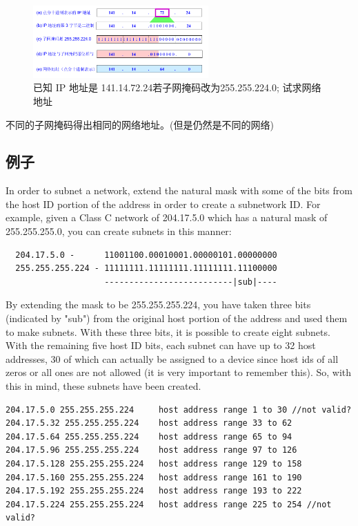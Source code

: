 \documentclass[a4paper]{report}
\begin{document}
\begin{figure}[H]
\centering
\includegraphics[width=0.6\textwidth]{ip_submask_exp_2.png}
\caption{已知 IP 地址是 141.14.72.24若子网掩码改为255.255.224.0; 试求网络地址}
\end{figure}
不同的子网掩码得出相同的网络地址。(但是仍然是不同的网络)

\subsection{例子}

In order to subnet a network, extend the natural mask with some of the bits from the host ID portion of the address in order to create a subnetwork ID. For example, given a Class C network of 204.17.5.0 which has a natural mask of 255.255.255.0, you can create subnets in this manner:
\begin{verbatim}
  204.17.5.0 -      11001100.00010001.00000101.00000000
  255.255.255.224 - 11111111.11111111.11111111.11100000
                    --------------------------|sub|----
\end{verbatim}
By extending the mask to be 255.255.255.224, you have taken three bits (indicated by "sub") from the original host portion of the address and used them to make subnets. With these three bits, it is possible to create eight subnets. With the remaining five host ID bits, each subnet can have up to 32 host addresses, 30 of which can actually be assigned to a device since host ids of all zeros or all ones are not allowed (it is very important to remember this). So, with this in mind, these subnets have been created.
\begin{verbatim}
204.17.5.0 255.255.255.224     host address range 1 to 30 //not valid? 
204.17.5.32 255.255.255.224    host address range 33 to 62
204.17.5.64 255.255.255.224    host address range 65 to 94
204.17.5.96 255.255.255.224    host address range 97 to 126
204.17.5.128 255.255.255.224   host address range 129 to 158
204.17.5.160 255.255.255.224   host address range 161 to 190
204.17.5.192 255.255.255.224   host address range 193 to 222
204.17.5.224 255.255.255.224   host address range 225 to 254 //not valid? 
\end{verbatim}
\end{document}

